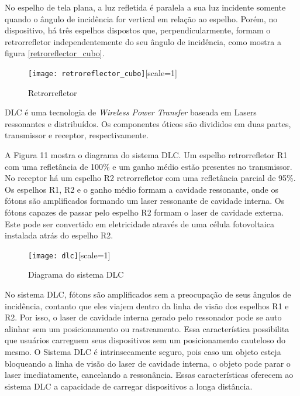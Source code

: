 No espelho de tela plana, a luz refletida é paralela a sua luz incidente somente quando o ângulo de incidência for vertical em relação ao espelho. Porém, no dispositivo, há três espelhos dispostos que, perpendicularmente, formam o retrorrefletor independentemente do seu ângulo de incidência, como mostra a figura \ref{retroreflector_cubo}.

\begin{figure}[ht!]
	\centering
	\caption{Retrorrefletor}
	\label{fig:retroreflector_cubo}
	\texttt{[image: retroreflector\_cubo]}[scale=1]
\end{figure}

DLC é uma tecnologia de \emph{Wireless Power Transfer} baseada em Lasers ressonantes e distribuídos. Os componentes óticos são divididos em duas partes, transmissor e receptor, respectivamente. 

A Figura 11 mostra o diagrama do sistema DLC. Um espelho retrorrefletor R1 com uma refletância de 100\% e um ganho médio estão presentes no transmissor. No receptor há um espelho R2 retrorrefletor com uma refletância parcial de 95\%. Os espelhos R1, R2 e o ganho médio formam a cavidade ressonante, onde os fótons são amplificados formando um laser ressonante de cavidade interna. Os fótons capazes de passar pelo espelho R2 formam o laser de cavidade externa. Este pode ser convertido em eletricidade através de uma célula fotovoltaica instalada atrás do espelho R2.

\begin{figure}[ht!]
	\centering
	\caption{Diagrama do sistema DLC}
	\label{fig:dlc}
	\texttt{[image: dlc]}[scale=1]
\end{figure}

No sistema DLC, fótons são amplificados sem a preocupação de seus ângulos de incidência, contanto que eles viajem dentro da linha de visão dos espelhos R1 e R2. Por isso, o laser de cavidade interna gerado pelo ressonador pode se auto alinhar sem um posicionamento ou rastreamento. Essa característica possibilita que usuários carreguem seus dispositivos sem um posicionamento cauteloso do mesmo. O Sistema DLC é intrinsecamente seguro, pois caso um objeto esteja bloqueando a linha de visão do laser de cavidade interna, o objeto pode parar o laser imediatamente, cancelando a ressonância. Essas características oferecem ao sistema DLC a capacidade de carregar dispositivos a longa distância.



